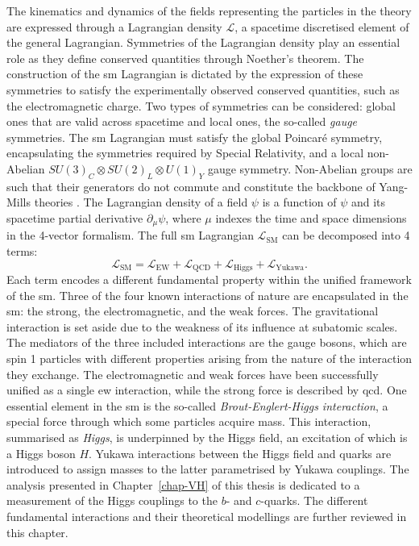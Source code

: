 The kinematics and dynamics of the fields representing the particles in the theory are expressed through a Lagrangian density $\mathcal{L}$, a spacetime discretised element of the general Lagrangian. Symmetries of the Lagrangian density play an essential role as they define conserved quantities through Noether's theorem. The construction of the \gls{sm} Lagrangian is dictated by the expression of these symmetries to satisfy the experimentally observed conserved quantities, such as the electromagnetic charge. Two types of symmetries can be considered: global ones that are valid across spacetime and local ones, the so-called \textit{gauge} symmetries. The \gls{sm} Lagrangian must satisfy the global Poincaré symmetry, encapsulating the symmetries required by Special Relativity, and a local non-Abelian $SU(3)_C \otimes SU(2)_L \otimes U(1)_Y$ gauge symmetry. Non-Abelian groups are such that their generators do not commute and constitute the backbone of Yang-Mills theories \cite{PhysRev.96.191}. The Lagrangian density of a field $\psi$ is a function of $\psi$ and its spacetime partial derivative $\partial_{\mu} \psi$, where $\mu$ indexes the time and space dimensions in the 4-vector formalism. The full \gls{sm} Lagrangian $\mathcal{L}_{\text{SM}}$ can be decomposed into 4 terms:
\begin{equation}\label{eq-SMGlobal}
    \mathcal{L}_{\text{SM}} = \mathcal{L}_{\text{EW}} + \mathcal{L}_{\text{QCD}} + \mathcal{L}_{\text{Higgs}} + \mathcal{L}_{\text{Yukawa}}.
\end{equation}
Each term encodes a different fundamental property within the unified framework of the \gls{sm}. Three of the four known interactions of nature are encapsulated in the \gls{sm}: the strong, the electromagnetic, and the weak forces. The gravitational interaction is set aside due to the weakness of its influence at subatomic scales. The mediators of the three included interactions are the gauge bosons, which are spin 1 particles with different properties arising from the nature of the interaction they exchange. The electromagnetic and weak forces have been successfully unified as a single \gls{ew} interaction, while the strong force is described by \gls{qcd}. One essential element in the \gls{sm} is the so-called \textit{Brout-Englert-Higgs interaction}, a special force through which some particles acquire mass. This interaction, summarised as \textit{Higgs}, is underpinned by the Higgs field, an excitation of which is a Higgs boson $H$. Yukawa interactions between the Higgs field and quarks are introduced to assign masses to the latter parametrised by Yukawa couplings. The analysis presented in Chapter~\ref{chap-VH} of this thesis is dedicated to a measurement of the Higgs couplings to the $b$- and $c$-quarks. The different fundamental interactions and their theoretical modellings are further reviewed in this chapter.

